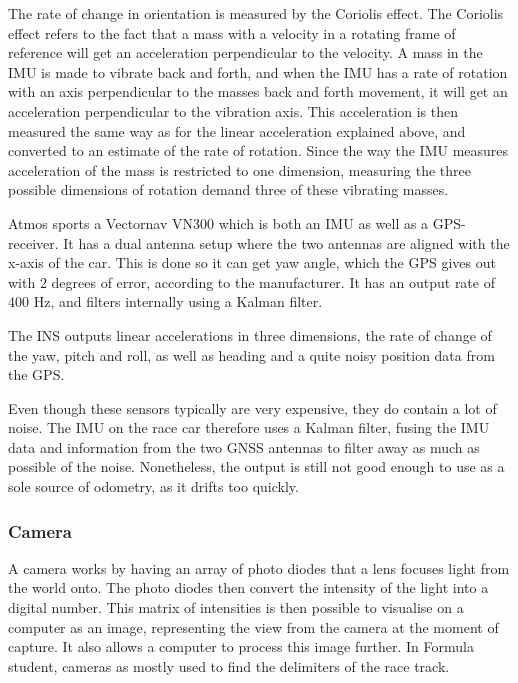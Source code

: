 The rate of change in orientation is measured by the Coriolis effect. The Coriolis effect refers to the fact that a mass with a velocity in a rotating frame of reference will get an acceleration perpendicular to the velocity. A mass in the \gls{IMU} is made to vibrate back and forth, and when the \gls{IMU} has a rate of rotation  with an axis perpendicular to the masses back and forth movement, it will get an acceleration perpendicular to the vibration axis. This acceleration is then measured the same way as for the linear acceleration explained above, and converted to an estimate of the rate of rotation. Since the way the \gls{IMU} measures acceleration of the mass is restricted to one dimension, measuring the three possible dimensions of rotation demand three of these vibrating masses. 

Atmos sports a Vectornav VN300 which is both an \gls{IMU} as well as a \gls{GPS}-receiver. It has a dual antenna setup where the two antennas are aligned with the x-axis of the car. This is done so it can get yaw angle, which the GPS gives out with 2 degrees of error, according to the manufacturer. It has an output rate of 400 \si{\hertz}, and filters internally using a Kalman filter. 

The INS outputs linear accelerations in three dimensions, the rate of change of the yaw, pitch and roll, as well as heading and a quite noisy position data from the GPS. 

Even though these sensors typically are very expensive, they do contain a lot of noise. The \gls{IMU} on the race car therefore uses a Kalman filter, fusing the \gls{IMU} data and information from the two \gls{GNSS} antennas to filter away as much as possible of the noise. Nonetheless, the output is still not good enough to use as a sole source of odometry, as it drifts too quickly.

\subsubsection{Camera}

A camera works by having an array of photo diodes that a lens focuses light from the world onto. The photo diodes then convert the intensity of the light into a digital number. This matrix of intensities is then possible to visualise on a computer as an image, representing the view from the camera at the moment of capture. It also allows a computer to process this image further. In Formula student, cameras as mostly used to find the delimiters of the race track.


